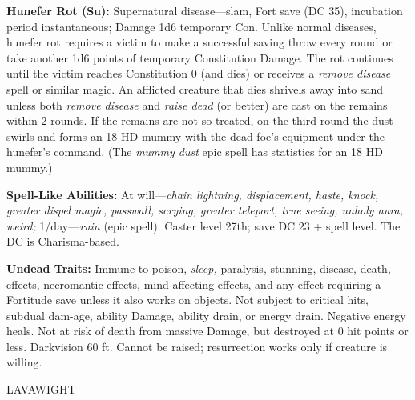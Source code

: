 \documentclass{article}
\begin{document}
{\textbf{Hunefer Rot (Su):} Supernatural disease---slam, Fort save (DC 35), incubation 
period instantaneous; Damage 1d6 temporary Con. Unlike normal diseases, hunefer 
rot requires a victim to make a successful saving throw every round or take another 
1d6 points of temporary Constitution Damage. The rot continues until the victim 
reaches Constitution 0 (and dies) or receives a \textit{remove disease }spell or 
similar magic. An afflicted creature that dies shrivels away into sand unless both 
\textit{remove disease }and \textit{raise dead }(or better) are cast on the remains 
within 2 rounds. If the remains are not so treated, on the third round the dust 
swirls and forms an 18 HD mummy with the dead foe's equipment under the hunefer's 
command. (The \textit{mummy dust }epic spell has statistics for an 18 HD mummy.) 

\textbf{Spell-Like Abilities: }At will---\textit{chain lightning, displacement, 
haste, knock, greater dispel magic, passwall, scrying, greater teleport, true seeing, 
unholy aura, weird; }1/day---\textit{ruin }(epic spell). Caster level 27th; save 
DC 23 + spell level. The DC is Charisma-based.

\textbf{Undead Traits:} Immune to poison, \textit{sleep, }paralysis, stunning, 
disease, death, effects, necromantic effects, mind-affecting effects, and any effect 
requiring a Fortitude save unless it also works on objects. Not subject to critical 
hits, subdual dam-age, ability Damage, ability drain, or energy drain. Negative 
energy heals. Not at risk of death from massive Damage, but destroyed at 0 hit 
points or less. Darkvision 60 ft. Cannot be raised; resurrection works only if 
creature is willing. 

\vspace{12pt}
{\LARGE{}LAVAWIGHT }

}
\end{document}
